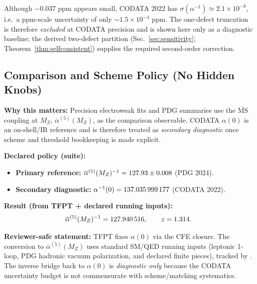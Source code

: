 Although $-0.037$ ppm appears small, CODATA 2022 has $\sigma(\alpha^{-1})\simeq 2.1\times 10^{-8}$, i.e.\ a ppm-scale uncertainty of only $\sim 1.5\times 10^{-4}$ ppm. The one-defect truncation is therefore \emph{excluded} at CODATA precision and is shown here only as a diagnostic baseline; the derived two-defect partition (Sec.~\ref{sec:sensitivity}; Theorem~\ref{thm:selfconsistent}) supplies the required second-order correction.

\TFPTAlphaSensitivityPlot

\subsection{Comparison and Scheme Policy (No Hidden Knobs)}
\label{sec:comparison-policy}

\begin{tcolorbox}[colback=yellow!3, colframe=yellow!60!black,
    title={\textbf{Primary comparison observable: $\overline{\alpha}^{(5)}(M_Z)$ ($\overline{\mathrm{MS}}$)}}, fonttitle=\bfseries\small]
\textbf{Why this matters:} Precision electroweak fits and PDG summaries use the $\overline{\mathrm{MS}}$ coupling at $M_Z$, $\overline{\alpha}^{(5)}(M_Z)$, as the comparison observable. CODATA $\alpha(0)$ is an on-shell/IR reference and is therefore treated as \emph{secondary diagnostic} once scheme and threshold bookkeeping is made explicit.

\textbf{Declared policy (suite):}
\begin{itemize}[leftmargin=1.5em, topsep=2pt, itemsep=1pt]
    \item \textbf{Primary reference:} $\overline{\alpha}^{(5)}(M_Z)^{-1} = \num{\TFPTalphaBarFiveInvMZRefNum} \pm \num{\TFPTalphaBarFiveInvMZRefSigma}$ (PDG 2024).
    \item \textbf{Secondary diagnostic:} $\alpha^{-1}(0)=\num[round-mode=places,round-precision=9]{\TFPTalphaInvCODATANum}$ (CODATA 2022).
\end{itemize}

\textbf{Result (from TFPT + declared running inputs):}
\[
\overline{\alpha}^{(5)}(M_Z)^{-1}=\num[round-mode=places,round-precision=6]{\TFPTalphaBarFiveInvMZPredNum},
\qquad
z=\num[round-mode=places,round-precision=3]{\TFPTalphaBarFiveInvMZZ}.
\]

\textbf{Reviewer-safe statement:} TFPT fixes $\alpha(0)$ via the CFE closure. The conversion to $\overline{\alpha}^{(5)}(M_Z)$ uses standard SM/QED running inputs (leptonic 1-loop, PDG hadronic vacuum polarization, and declared finite pieces), tracked by . The inverse bridge back to $\alpha(0)$ is \emph{diagnostic only} because the CODATA uncertainty budget is not commensurate with scheme/matching systematics.
\end{tcolorbox}

